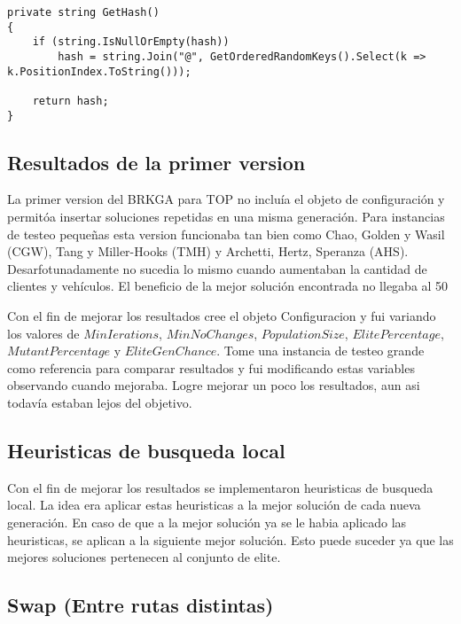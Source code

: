 \begin{lstlisting}
private string GetHash()
{
    if (string.IsNullOrEmpty(hash))
        hash = string.Join("@", GetOrderedRandomKeys().Select(k => k.PositionIndex.ToString()));

    return hash;
}
\end{lstlisting}

\subsection{Resultados de la primer version}

La primer version del BRKGA para TOP no incluía el objeto de configuración y permitóa insertar soluciones repetidas en una misma generación. Para instancias de testeo pequeñas esta version funcionaba tan bien como Chao, Golden y Wasil (CGW), Tang y Miller-Hooks (TMH) y Archetti, Hertz, Speranza (AHS). Desarfotunadamente no sucedia lo mismo cuando aumentaban la cantidad de clientes y vehículos. El beneficio de la mejor solución encontrada no llegaba al 50%

\bigskip

Con el fin de mejorar los resultados cree el objeto Configuracion y fui variando los valores de $MinIerations$, $MinNoChanges$, $PopulationSize$, $ElitePercentage$, $MutantPercentage$ y $EliteGenChance$. Tome una instancia de testeo grande como referencia para comparar resultados y fui modificando estas variables observando cuando mejoraba. Logre mejorar un poco los resultados, aun asi todavía estaban lejos del objetivo.

\subsection{Heuristicas de busqueda local}

Con el fin de mejorar los resultados se implementaron heuristicas de busqueda local. La idea era aplicar estas heuristicas a la mejor solución de cada nueva generación. En caso de que a la mejor solución ya se le habia aplicado las heuristicas, se aplican a la siguiente mejor solución. Esto puede suceder ya que las mejores soluciones pertenecen al conjunto de elite.

\subsection{Swap (Entre rutas distintas)}

